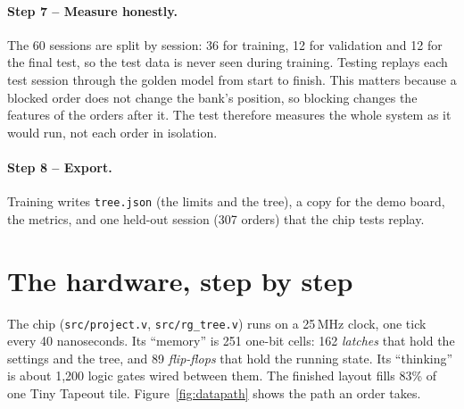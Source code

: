 \documentclass[11pt,a4paper]{article}
\newcommand{\code}[1]{\texttt{#1}}
\newcommand{\step}[2]{\paragraph{Step #1 -- #2.}}
\begin{document}
\step{7}{Measure honestly}
The 60 sessions are split by session: 36 for training, 12 for validation and 12 for the final test,
so the test data is never seen during training. Testing replays each test session through the
golden model from start to finish. This matters because a blocked order does not change the bank's
position, so blocking changes the features of the orders after it. The test therefore measures the
whole system as it would run, not each order in isolation.

\step{8}{Export}
Training writes \code{tree.json} (the limits and the tree), a copy for the demo board, the metrics,
and one held-out session (307 orders) that the chip tests replay.

\section{The hardware, step by step}

The chip (\code{src/project.v}, \code{src/rg\_tree.v}) runs on a 25\,MHz clock, one tick every
40 nanoseconds. Its ``memory'' is 251 one-bit cells: 162 \emph{latches} that hold the settings and the tree,
and 89 \emph{flip-flops} that hold the running state. Its ``thinking'' is about 1{,}200 logic
gates wired between them. The finished layout fills 83\% of one Tiny Tapeout tile. Figure~\ref{fig:datapath}
shows the path an order takes.
\end{document}
